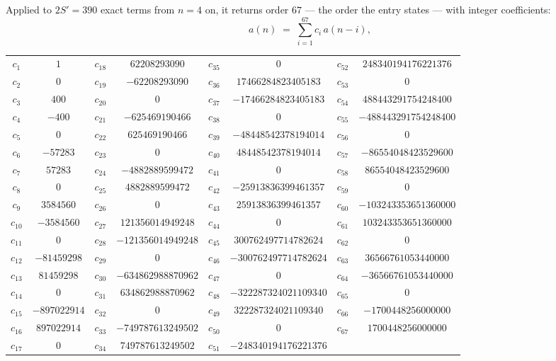 \documentclass[11pt,a4paper]{article}
\theoremstyle{plain}
\theoremstyle{definition}
\begin{document}
Applied to $2S'=390$ exact terms from $n=4$ on, it returns order $67$ --- the
order the entry states --- with integer coefficients:
\[
a(n)\;=\;\sum_{i=1}^{67}c_i\,a(n-i),
\]
\begin{center}\small
\begin{tabular}{cccccccc}
$c_{1}$ & $1$ & $c_{18}$ & $62208293090$ & $c_{35}$ & $0$ & $c_{52}$ & $248340194176221376$ \\
$c_{2}$ & $0$ & $c_{19}$ & $-62208293090$ & $c_{36}$ & $17466284823405183$ & $c_{53}$ & $0$ \\
$c_{3}$ & $400$ & $c_{20}$ & $0$ & $c_{37}$ & $-17466284823405183$ & $c_{54}$ & $488443291754248400$ \\
$c_{4}$ & $-400$ & $c_{21}$ & $-625469190466$ & $c_{38}$ & $0$ & $c_{55}$ & $-488443291754248400$ \\
$c_{5}$ & $0$ & $c_{22}$ & $625469190466$ & $c_{39}$ & $-48448542378194014$ & $c_{56}$ & $0$ \\
$c_{6}$ & $-57283$ & $c_{23}$ & $0$ & $c_{40}$ & $48448542378194014$ & $c_{57}$ & $-86554048423529600$ \\
$c_{7}$ & $57283$ & $c_{24}$ & $-4882889599472$ & $c_{41}$ & $0$ & $c_{58}$ & $86554048423529600$ \\
$c_{8}$ & $0$ & $c_{25}$ & $4882889599472$ & $c_{42}$ & $-25913836399461357$ & $c_{59}$ & $0$ \\
$c_{9}$ & $3584560$ & $c_{26}$ & $0$ & $c_{43}$ & $25913836399461357$ & $c_{60}$ & $-103243353651360000$ \\
$c_{10}$ & $-3584560$ & $c_{27}$ & $121356014949248$ & $c_{44}$ & $0$ & $c_{61}$ & $103243353651360000$ \\
$c_{11}$ & $0$ & $c_{28}$ & $-121356014949248$ & $c_{45}$ & $300762497714782624$ & $c_{62}$ & $0$ \\
$c_{12}$ & $-81459298$ & $c_{29}$ & $0$ & $c_{46}$ & $-300762497714782624$ & $c_{63}$ & $36566761053440000$ \\
$c_{13}$ & $81459298$ & $c_{30}$ & $-634862988870962$ & $c_{47}$ & $0$ & $c_{64}$ & $-36566761053440000$ \\
$c_{14}$ & $0$ & $c_{31}$ & $634862988870962$ & $c_{48}$ & $-322287324021109340$ & $c_{65}$ & $0$ \\
$c_{15}$ & $-897022914$ & $c_{32}$ & $0$ & $c_{49}$ & $322287324021109340$ & $c_{66}$ & $-1700448256000000$ \\
$c_{16}$ & $897022914$ & $c_{33}$ & $-749787613249502$ & $c_{50}$ & $0$ & $c_{67}$ & $1700448256000000$ \\
$c_{17}$ & $0$ & $c_{34}$ & $749787613249502$ & $c_{51}$ & $-248340194176221376$ &  &  \\
\end{tabular}
\end{center}
\end{document}
